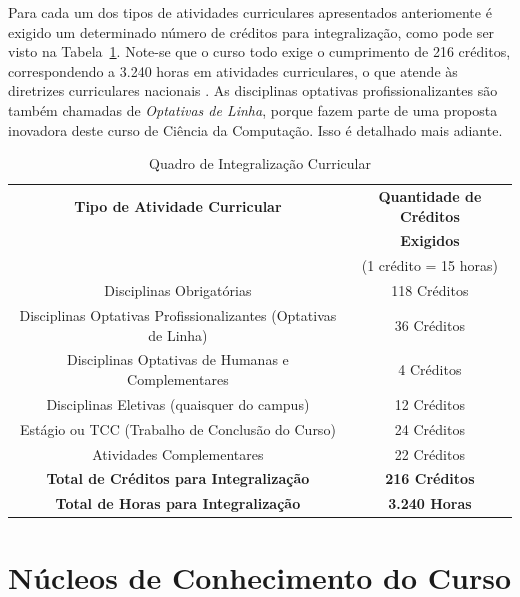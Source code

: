 Para cada um dos tipos de atividades curriculares apresentados anteriomente é exigido um determinado número de créditos para integralização, como pode ser visto na Tabela~\ref{table: quadro_integraliza}. Note-se que o curso todo exige o cumprimento de 216 créditos, correspondendo a 3.240 horas em atividades curriculares, o que atende às diretrizes curriculares nacionais \cite{DCN-BCC}. As disciplinas optativas profissionalizantes são também chamadas de \textit{Optativas de Linha}, porque fazem parte de uma proposta inovadora deste curso de Ciência da Computação. Isso é detalhado mais adiante.   

\begin{table}
\caption{Quadro de Integraliza\c c\~ao Curricular}
\centering
\label{table: quadro_integraliza}
\begin{tabular}{|c|c|}
\hline
\hline
\textbf{Tipo de Atividade Curricular}  & \textbf{Quantidade de Créditos} \\
 & \textbf{Exigidos}\\
 & (1 crédito = 15 horas) \\

\hline
Disciplinas Obrigat\'orias & 118 Cr\'editos \\
\hline
Disciplinas Optativas Profissionalizantes (Optativas de Linha) & 36 Cr\'editos \\
\hline
Disciplinas Optativas de Humanas e Complementares & 4 Cr\'editos \\
\hline
Disciplinas Eletivas (quaisquer do campus) & 12 Cr\'editos \\
\hline
Estágio ou TCC (Trabalho de Conclusão do Curso) & 24 Cr\'editos \\
\hline
Atividades Complementares& 22 Cr\'editos \\
\hline
\hline
\textbf{Total de Cr\'editos para Integraliza\c c\~ao} & \textbf{216 Cr\'editos} \\
\hline
\textbf{Total de Horas para Integraliza\c c\~ao}  & \textbf{3.240 Horas} \\

\hline

\hline
\end{tabular}
\end{table}


\section{Núcleos de Conhecimento do Curso} \label{sec:marco_estrutural_areas_conhecimento}

